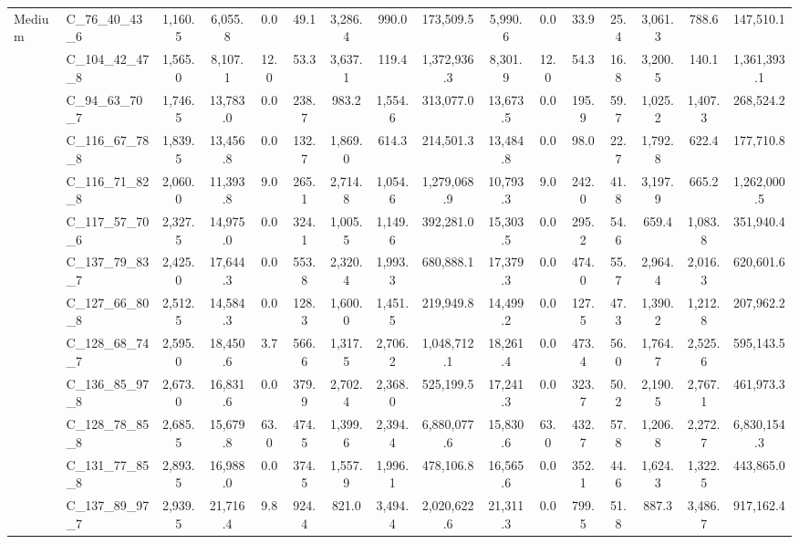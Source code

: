 \begin{table}[htb]
{\begin{tabular}{llcccccccccccccc}
    \multirow[c]{14}{*}{Medium} & C\_76\_40\_43\_6 & 1,160.5 & 6,055.8 & 0.0 & 49.1 & 3,286.4 & 990.0 & 173,509.5 & 5,990.6 & 0.0 & 33.9 & 25.4 & 3,061.3 & 788.6 & 147,510.1 \\
     & C\_104\_42\_47\_8 & 1,565.0 & 8,107.1 & 12.0 & 53.3 & 3,637.1 & 119.4 & 1,372,936.3 & 8,301.9 & 12.0 & 54.3 & 16.8 & 3,200.5 & 140.1 & 1,361,393.1 \\
     & C\_94\_63\_70\_7 & 1,746.5 & 13,783.0 & 0.0 & 238.7 & 983.2 & 1,554.6 & 313,077.0 & 13,673.5 & 0.0 & 195.9 & 59.7 & 1,025.2 & 1,407.3 & 268,524.2 \\
     & C\_116\_67\_78\_8 & 1,839.5 & 13,456.8 & 0.0 & 132.7 & 1,869.0 & 614.3 & 214,501.3 & 13,484.8 & 0.0 & 98.0 & 22.7 & 1,792.8 & 622.4 & 177,710.8 \\
     & C\_116\_71\_82\_8 & 2,060.0 & 11,393.8 & 9.0 & 265.1 & 2,714.8 & 1,054.6 & 1,279,068.9 & 10,793.3 & 9.0 & 242.0 & 41.8 & 3,197.9 & 665.2 & 1,262,000.5 \\
     & C\_117\_57\_70\_6 & 2,327.5 & 14,975.0 & 0.0 & 324.1 & 1,005.5 & 1,149.6 & 392,281.0 & 15,303.5 & 0.0 & 295.2 & 54.6 & 659.4 & 1,083.8 & 351,940.4 \\
     & C\_137\_79\_83\_7 & 2,425.0 & 17,644.3 & 0.0 & 553.8 & 2,320.4 & 1,993.3 & 680,888.1 & 17,379.3 & 0.0 & 474.0 & 55.7 & 2,964.4 & 2,016.3 & 620,601.6 \\
     & C\_127\_66\_80\_8 & 2,512.5 & 14,584.3 & 0.0 & 128.3 & 1,600.0 & 1,451.5 & 219,949.8 & 14,499.2 & 0.0 & 127.5 & 47.3 & 1,390.2 & 1,212.8 & 207,962.2 \\
     & C\_128\_68\_74\_7 & 2,595.0 & 18,450.6 & 3.7 & 566.6 & 1,317.5 & 2,706.2 & 1,048,712.1 & 18,261.4 & 0.0 & 473.4 & 56.0 & 1,764.7 & 2,525.6 & 595,143.5 \\
     & C\_136\_85\_97\_8 & 2,673.0 & 16,831.6 & 0.0 & 379.9 & 2,702.4 & 2,368.0 & 525,199.5 & 17,241.3 & 0.0 & 323.7 & 50.2 & 2,190.5 & 2,767.1 & 461,973.3 \\
     & C\_128\_78\_85\_8 & 2,685.5 & 15,679.8 & 63.0 & 474.5 & 1,399.6 & 2,394.4 & 6,880,077.6 & 15,830.6 & 63.0 & 432.7 & 57.8 & 1,206.8 & 2,272.7 & 6,830,154.3 \\
     & C\_131\_77\_85\_8 & 2,893.5 & 16,988.0 & 0.0 & 374.5 & 1,557.9 & 1,996.1 & 478,106.8 & 16,565.6 & 0.0 & 352.1 & 44.6 & 1,624.3 & 1,322.5 & 443,865.0 \\
     & C\_137\_89\_97\_7 & 2,939.5 & 21,716.4 & 9.8 & 924.4 & 821.0 & 3,494.4 & 2,020,622.6 & 21,311.3 & 0.0 & 799.5 & 51.8 & 887.3 & 3,486.7 & 917,162.4 \\

\end{tabular}}
\end{table}

